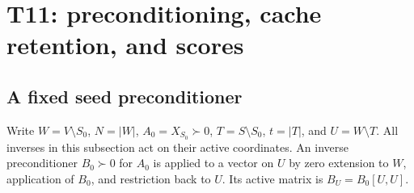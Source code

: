 \documentclass[11pt]{article}
\begin{document}
\section{T11: preconditioning, cache retention, and scores}

\subsection{A fixed seed preconditioner}
Write $W=V\setminus S_0$, $N=|W|$, $A_0=X_{S_0}\succ0$,
$T=S\setminus S_0$, $t=|T|$, and $U=W\setminus T$.
All inverses in this subsection act on their active coordinates.
An inverse preconditioner $B_0\succ0$ for $A_0$ is applied to a
vector on $U$ by zero extension to $W$, application of $B_0$, and
restriction back to $U$. Its active matrix is $B_U=B_0[U,U]$.
\end{document}
